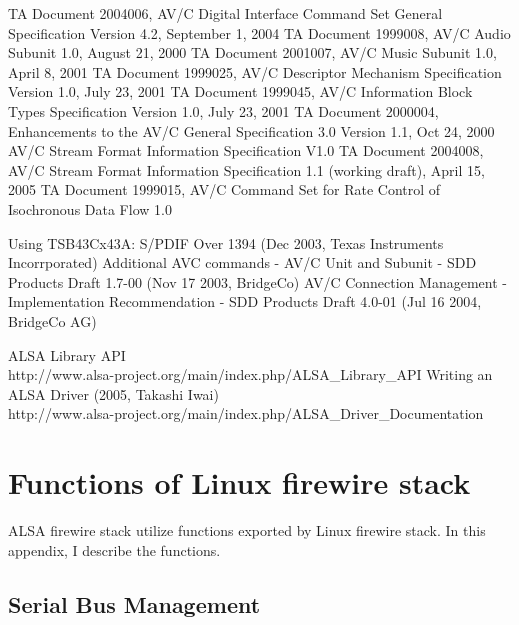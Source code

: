 \documentclass[onecolumn]{article}
\begin{document}
\begin{thebibliography}{99}
TA Document 2004006, AV/C Digital Interface Command Set General Specification Version 4.2, September 1, 2004
TA Document 1999008, AV/C Audio Subunit 1.0, August 21, 2000
TA Document 2001007, AV/C Music Subunit 1.0, April 8, 2001
TA Document 1999025, AV/C Descriptor Mechanism Specification Version 1.0, July 23, 2001
TA Document 1999045, AV/C Information Block Types Specification Version 1.0, July 23, 2001
TA Document 2000004, Enhancements to the AV/C General Specification 3.0 Version 1.1, Oct 24, 2000
AV/C Stream Format Information Specification V1.0
TA Document 2004008, AV/C Stream Format Information Specification 1.1 (working draft), April 15, 2005
TA Document 1999015, AV/C Command Set for Rate Control of Isochronous Data Flow 1.0

Using TSB43Cx43A: S/PDIF Over 1394 (Dec 2003, Texas Instruments Incorrporated)
Additional AVC commands - AV/C Unit and Subunit - SDD Products Draft 1.7-00 (Nov 17 2003, BridgeCo)
AV/C Connection Management - Implementation Recommendation - SDD Products Draft 4.0-01 (Jul 16 2004, BridgeCo AG)

ALSA Library API \\
http://www.alsa-project.org/main/index.php/ALSA\_Library\_API
Writing an ALSA Driver (2005, Takashi Iwai) \\
http://www.alsa-project.org/main/index.php/ALSA\_Driver\_Documentation

\end{thebibliography}

\newpage

\appendix

\section{Functions of Linux firewire stack}

ALSA firewire stack utilize functions exported by Linux firewire stack. In this appendix, I describe the functions.

\subsection{Serial Bus Management}
\end{document}
